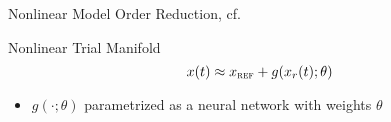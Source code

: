 \begin{frame}{Nonlinear Model Order Reduction, cf.~\cite{Lee2020}}
    \begin{block}{Nonlinear Trial Manifold}
        \begin{equation*}
            x(t) \approx x_{\textsc{ref}} + g(x_r(t); \theta)
        \end{equation*}
    \end{block}
    \begin{itemize}
        \item $g(\cdot; \theta)$ parametrized as a neural network with weights $\theta$
    \end{itemize}

    {
        \begin{columns}
            \begin{column}{.5\textwidth}
            \end{column}
            \begin{column}{.42\textwidth}
            \end{column}
        \end{columns}
    }
\end{frame}

